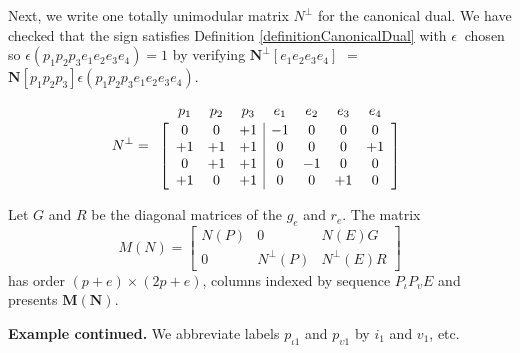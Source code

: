 \documentclass[12pt]{article}
\theoremstyle{definition}
\newcommand{\epsilonfun}{\ensuremath{\epsilon}}
\newcommand{\Is}{\ensuremath{\iota}}
\newcommand{\Vs}{\ensuremath{\upsilon}}
\newcommand{\ext}[1]{\ensuremath{\mathbf{#1}}}
\begin{document}
Next, we write one totally unimodular 
matrix $N^\perp$ for the canonical
dual.  We have checked that the sign satisfies Definition 
\ref{definitionCanonicalDual} with
$\epsilonfun\ $ chosen so $\epsilon(p_1p_2p_3e_1e_2e_3e_4)=1$
by verifying 
$\ext{N}^\perp[e_1e_2e_3e_4]$ 
$=$
$\ext{N}[p_1p_2p_3]\epsilon(p_1p_2p_3e_1e_2e_3e_4)$.



\[
N^\perp=
\begin{array}{c}
\begin{array}{ccccccc}
p_1 & p_2 & p_3 & e_1 & e_2 & e_3 & e_4 \\[-1em]
\hphantom{+1} & \hphantom{+1} &\hphantom{+1} &\hphantom{+1} &\hphantom{+1} &\hphantom{+1} &\hphantom{+1} 
\end{array} \\ 
\left[\begin{array}{ccc|cccc}
  0 &  0  &  +1 &  -1 &   0 &  0  & 0 \\
 +1 &  +1 &  +1 &   0 &   0 &  0  & +1\\
  0 &  +1 &  +1 &   0 &  -1 &  0  &  0\\
 +1 &   0 &  +1 &   0 &   0 & +1  &  0
	\end{array}\right]
  \end{array}
\]

Let 
$G$ and $R$ be the diagonal matrices of the $g_e$ and $r_e$.
The matrix
\begin{equation}
\label{matrixM}
M(N)
=
\left[
	\begin{array}{ccc}
		N(P) & 0 & N(E)G \\
		0    & N^{\perp}(P) & N^{\perp}(E)R
	\end{array}
  \right]
\end{equation}
has order $(p+e)\times(2p+e)$, columns indexed by sequence
$P_{\Is}P_{\Vs}E$ and presents $\ext{M}(\ext{N})$.

\textbf{Example continued.}
We abbreviate labels $p_{\Is 1}$ and $p_{\Vs 1}$ by $i_1$ and $v_1$, etc.
\end{document}
